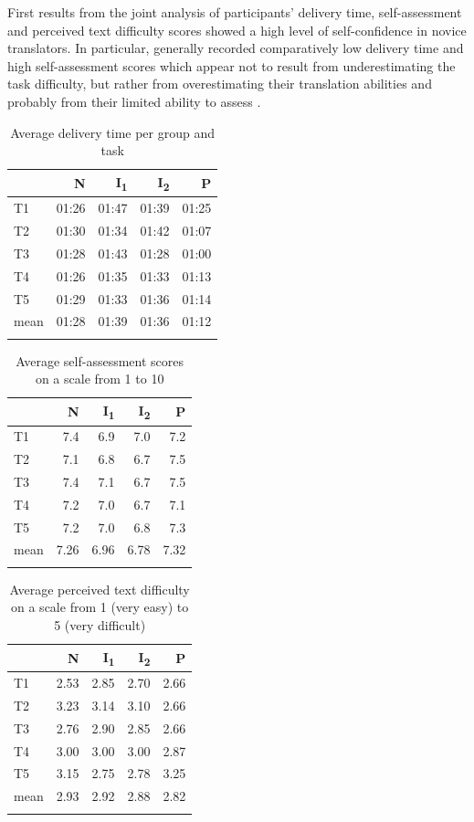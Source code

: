 \documentclass[output=paper]{LSP/langsci}
\begin{document}
First results from the joint analysis of participants' delivery time, self-assessment and perceived text difficulty scores showed a high level of self-confidence in novice translators. In particular,  generally recorded comparatively low delivery time and high self-assessment scores which appear not to result from underestimating the task difficulty, but rather from overestimating their translation abilities and probably from their limited ability to assess .

\begin{table}
\caption{Average delivery time per group and task}
\label{quinci:tab:2}
\begin{tabular}{lrrrr}
\lsptoprule
& N & I\textsubscript{1} & I\textsubscript{2} & P \\
\midrule
T1 & 01:26 & 01:47 & 01:39 & 01:25\\
T2 & 01:30 & 01:34 & 01:42 & 01:07\\
T3 & 01:28 & 01:43 & 01:28 & 01:00\\
T4 & 01:26 & 01:35 & 01:33 & 01:13\\
T5 & 01:29 & 01:33 & 01:36 & 01:14\\
\midrule
mean & 01:28 & 01:39 & 01:36 & 01:12\\
\lspbottomrule
\end{tabular}
\end{table}

\begin{table}
\caption{Average self-assessment scores on a scale from 1 to 10}
\label{quinci:tab:3}
\begin{tabular}{lrrrr}
\lsptoprule
& N & I\textsubscript{1} & I\textsubscript{2} & P\\
\midrule
T1 & 7.4 & 6.9 & 7.0 & 7.2\\
T2 & 7.1 & 6.8 & 6.7 & 7.5\\
T3 & 7.4 & 7.1 & 6.7 & 7.5\\
T4 & 7.2 & 7.0 & 6.7 & 7.1\\
T5 & 7.2 & 7.0 & 6.8 & 7.3\\
\midrule
mean & 7.26 & 6.96 & 6.78 & 7.32\\
\lspbottomrule
\end{tabular}
\end{table}

\begin{table}
\caption{Average perceived text difficulty on a scale from 1 (very easy) to 5 (very difficult)}
\label{quinci:tab:4}
\begin{tabular}{lrrrr}
\lsptoprule
& N & I\textsubscript{1} & I\textsubscript{2} & P \\
\midrule
T1 & 2.53 & 2.85 & 2.70 & 2.66\\
T2 & 3.23 & 3.14 & 3.10 & 2.66\\
T3 & 2.76 & 2.90 & 2.85 & 2.66\\
T4 & 3.00 & 3.00 & 3.00 & 2.87\\
T5 & 3.15 & 2.75 & 2.78 & 3.25\\
\midrule
mean & 2.93 & 2.92 & 2.88 & 2.82\\
\lspbottomrule
\end{tabular}
\end{table}
\end{document}
